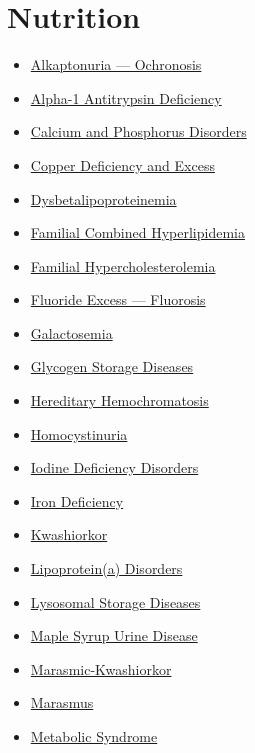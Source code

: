\section*{Nutrition}
\label{sec:organ_nutrition}
\begin{itemize}[noitemsep]
  \item \hyperlink{sec:Alkaptonuria}{Alkaptonuria --- Ochronosis}
  \item \hyperlink{sec:Alpha-1 Antitrypsin Deficiency}{Alpha-1 Antitrypsin Deficiency}
  \item \hyperlink{sec:Calcium and Phosphorus Disorders}{Calcium and Phosphorus Disorders}
  \item \hyperlink{sec:Copper Disorders}{Copper Deficiency and Excess}
  \item \hyperlink{sec:Dysbetalipoproteinemia}{Dysbetalipoproteinemia}
  \item \hyperlink{sec:Familial Combined Hyperlipidemia}{Familial Combined Hyperlipidemia}
  \item \hyperlink{sec:Familial Hypercholesterolemia}{Familial Hypercholesterolemia}
  \item \hyperlink{sec:Fluorosis}{Fluoride Excess --- Fluorosis}
  \item \hyperlink{sec:Galactosemia}{Galactosemia}
  \item \hyperlink{sec:Glycogen Storage Diseases}{Glycogen Storage Diseases}
  \item \hyperlink{sec:nutrition:Hereditary Hemochromatosis}{Hereditary Hemochromatosis}
  \item \hyperlink{sec:Homocystinuria}{Homocystinuria}
  \item \hyperlink{sec:Iodine Deficiency Disorders}{Iodine Deficiency Disorders}
  \item \hyperlink{sec:Iron Deficiency}{Iron Deficiency}
  \item \hyperlink{sec:Kwashiorkor}{Kwashiorkor}
  \item \hyperlink{sec:Lipoprotein(a) Disorders}{Lipoprotein(a) Disorders}
  \item \hyperlink{sec:Lysosomal Storage Diseases}{Lysosomal Storage Diseases}
  \item \hyperlink{sec:Maple Syrup Urine Disease}{Maple Syrup Urine Disease}
  \item \hyperlink{sec:Marasmic-Kwashiorkor}{Marasmic-Kwashiorkor}
  \item \hyperlink{sec:Marasmus}{Marasmus}
  \item \hyperlink{sec:Metabolic Syndrome}{Metabolic Syndrome}

\end{itemize}
